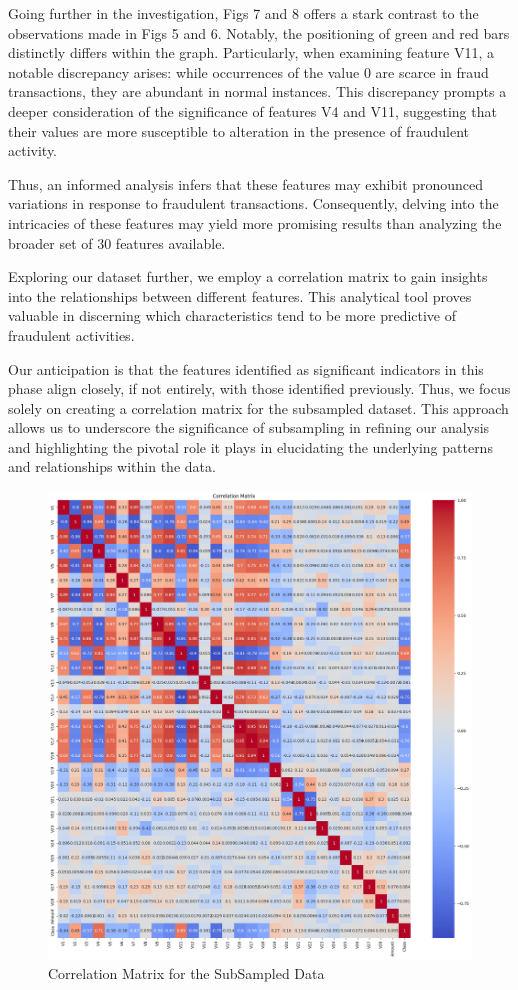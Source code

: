 \documentclass[conference]{IEEEtran}
\begin{document}
Going further in the investigation, Figs 7 and 8 offers a stark contrast to the observations made in Figs 5 and 6. Notably, the positioning of green and red bars distinctly differs within the graph. Particularly, when examining feature V11, a notable discrepancy arises: while occurrences of the value 0 are scarce in fraud transactions, they are abundant in normal instances. This discrepancy prompts a deeper consideration of the significance of features V4 and V11, suggesting that their values are more susceptible to alteration in the presence of fraudulent activity.

Thus, an informed analysis infers that these features may exhibit pronounced variations in response to fraudulent transactions. Consequently, delving into the intricacies of these features may yield more promising results than analyzing the broader set of 30 features available.


Exploring our dataset further, we employ a correlation matrix to gain insights into the relationships between different features. This analytical tool proves valuable in discerning which characteristics tend to be more predictive of fraudulent activities.

Our anticipation is that the features identified as significant indicators in this phase align closely, if not entirely, with those identified previously. Thus, we focus solely on creating a correlation matrix for the subsampled dataset. This approach allows us to underscore the significance of subsampling in refining our analysis and highlighting the pivotal role it plays in elucidating the underlying patterns and relationships within the data.

\begin{figure}
    \centering
    \includegraphics[width=1\linewidth]{images/correlationmatrix.png}
    \caption{Correlation Matrix for the SubSampled Data}
    \label{fig:enter-label}
\end{figure}
\end{document}
